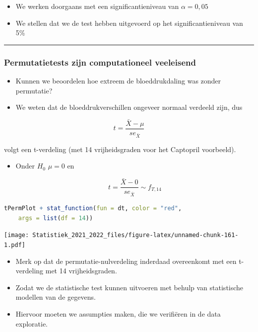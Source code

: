 \documentclass[
  12pt,dutch,coursenotes]{book}
\theoremstyle{definition}
\theoremstyle{definition}
\theoremstyle{definition}
\theoremstyle{definition}
\theoremstyle{remark}
\begin{document}
\begin{itemize}
\item
  We werken doorgaans met een significantieniveau van \(\alpha = 0,05\)
\item
  We stellen dat we de test hebben uitgevoerd op het significantieniveau van 5\%
\end{itemize}

\begin{center}\rule{0.5\linewidth}{0.5pt}\end{center}

\hypertarget{permutatietests-zijn-computationeel-veeleisend}{%
\subsubsection{Permutatietests zijn computationeel veeleisend}\label{permutatietests-zijn-computationeel-veeleisend}}

\begin{itemize}
\item
  Kunnen we beoordelen hoe extreem de bloeddrukdaling was zonder permutatie?
\item
  We weten dat de bloeddrukverschillen ongeveer normaal verdeeld zijn, dus
\end{itemize}

\[t=\frac{\bar X - \mu}{se_{\bar X}}\]

volgt een t-verdeling (met 14 vrijheidsgraden voor het Captopril voorbeeld).

\begin{itemize}
\item
  Onder \(H_0\) \(\mu=0\) en

  \[t=\frac{\bar X-0}{se_{\bar X}}\sim f_{T,14}\]
\end{itemize}

\begin{lstlisting}[language=R]
tPermPlot + stat_function(fun = dt, color = "red",
    args = list(df = 14))
\end{lstlisting}

\texttt{[image: Statistiek\_2021\_2022\_files/figure-latex/unnamed-chunk-161-1.pdf]}

\begin{itemize}
\item
  Merk op dat de permutatie-nulverdeling inderdaad overeenkomt met een t-verdeling met 14 vrijheidsgraden.
\item
  Zodat we de statistische test kunnen uitvoeren met behulp van statistische modellen van de gegevens.
\item
  Hiervoor moeten we assumpties maken, die we verifiëren in de data exploratie.
\end{itemize}
\end{document}
